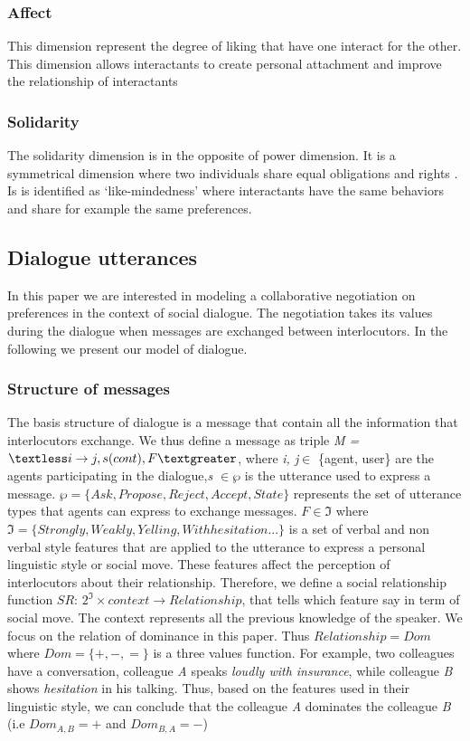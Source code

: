 \documentclass{llncs}
\begin{document}
\subsubsection{Affect}
This dimension represent the degree of liking that have one interact for the other. This dimension allows interactants to create personal attachment and improve the relationship of interactants \cite{nicholson2001role}
\subsubsection{Solidarity}
The solidarity dimension is in the opposite of power dimension. It is a symmetrical dimension where two individuals share equal obligations and rights \cite{svennevig2000getting}. Is is identified as ‘like-mindedness’ \cite{bickmore2005establishing} where interactants have the same behaviors and share for example the same preferences.
\subsection{Dialogue utterances}
In this paper we are interested in  modeling a collaborative negotiation on preferences in the context of social dialogue. The negotiation takes its values during the dialogue when messages are exchanged between interlocutors. In the following we present our model of dialogue.
\subsubsection{Structure of messages}
The basis structure of dialogue is a message that contain all the information that interlocutors exchange. We thus define a message as triple \emph{M = $\textless i \rightarrow j, s(cont), F  \textgreater$}, where \emph{i, j}$\in$ \{agent, user\} are the agents participating in the dialogue,\emph{s $\in \wp$}  is the utterance used to express a message. $\wp = \{ Ask, Propose, Reject, Accept, State\}$  represents the set of utterance types \cite{searle1969speech} that agents can express to exchange messages. 
 $F \in \Im $  where $\Im = \{ Strongly, Weakly, Yelling, With hesitation ...\}$ is a set of verbal and non verbal style features that are applied to the utterance to express a personal linguistic style or social move. These features affect the perception of interlocutors about their relationship. Therefore, we define a social relationship function $SR$: $2^\Im  \times context \rightarrow Relationship $, that tells which feature say in term of social move. The context represents all the previous knowledge of the speaker. We focus on the relation of dominance in this paper. Thus $Relationship = Dom$ where  $Dom = \{+, -, =\}$ is a three values function. For example, two colleagues have a conversation, colleague \emph{A} speaks \textit{loudly with insurance}, while colleague \emph{B} shows \textit{hesitation} in his talking. Thus, based on the features used in their linguistic style, we can conclude that the colleague \emph{A}  dominates  the colleague \emph{B} (i.e $Dom_{A,B} = +$ and $Dom_{B,A} = -$)
 
\end{document}
